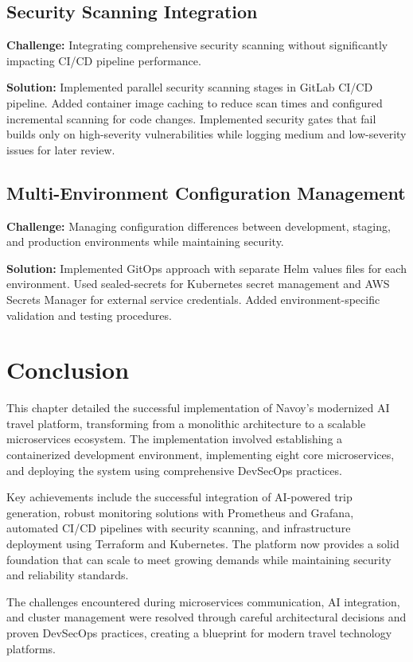 \subsection{Security Scanning Integration}
\textbf{Challenge:} Integrating comprehensive security scanning without significantly impacting CI/CD pipeline performance.

\textbf{Solution:} Implemented parallel security scanning stages in GitLab CI/CD pipeline. Added container image caching to reduce scan times and configured incremental scanning for code changes. Implemented security gates that fail builds only on high-severity vulnerabilities while logging medium and low-severity issues for later review.

\subsection{Multi-Environment Configuration Management}
\textbf{Challenge:} Managing configuration differences between development, staging, and production environments while maintaining security.

\textbf{Solution:} Implemented GitOps approach with separate Helm values files for each environment. Used sealed-secrets for Kubernetes secret management and AWS Secrets Manager for external service credentials. Added environment-specific validation and testing procedures.

\setcounter{secnumdepth}{0} %
\section{Conclusion}
This chapter detailed the successful implementation of Navoy's modernized AI travel platform, transforming from a monolithic architecture to a scalable microservices ecosystem. The implementation involved establishing a containerized development environment, implementing eight core microservices, and deploying the system using comprehensive DevSecOps practices.

Key achievements include the successful integration of AI-powered trip generation, robust monitoring solutions with Prometheus and Grafana, automated CI/CD pipelines with security scanning, and infrastructure deployment using Terraform and Kubernetes. The platform now provides a solid foundation that can scale to meet growing demands while maintaining security and reliability standards.

The challenges encountered during microservices communication, AI integration, and cluster management were resolved through careful architectural decisions and proven DevSecOps practices, creating a blueprint for modern travel technology platforms.
